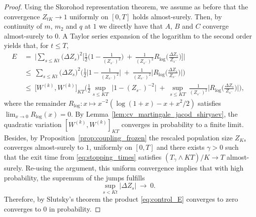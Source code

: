 \begin{refsegment}
\begin{proof}
Using the Skorohod representation theorem, we assume as before that the
convergence $Z_{tK}\to 1$ uniformly on $[0,T]$ holds almost-surely.
Then, by continuity of $m$, $m_2$ and $q$ at $1$ we directly have that
$A$, $B$ and $C$ converge almost-surely to $0$.
A Taylor series expansion of the logarithm to the second order yields
that, for $t\leqslant T$,
\begin{align}\nonumber
    E\ &= \ \Big|\sum_{s\leqslant Kt} \big(\Delta {Z}_{s}\big)^2\bigg[\frac{1}{2}\Big(1-\frac{1}{({Z}_{s^-})^2}\Big)\ +\ \frac{1}{({Z}_{s^-})^2}  R_{\log}\Big(\frac{\Delta {Z}_{s}}{{Z}_{s^-}}\Big)\bigg]\Big|\\\nonumber
    &\leqslant \ \sum_{s\leqslant Kt} \big(\Delta {Z}_{s}\big)^2\bigg(\frac{1}{2}\Big|1-\frac{1}{({Z}_{s^-})^2}\Big|\ +\ \frac{1}{({Z}_{s^-})^2}\Big| R_{\log}\Big(\frac{\Delta {Z}_{s}}{{Z}_{s^-}}\Big)\Big|\bigg)\\ \label{eq:control_E}
      &\leqslant\ \big[W^{(k)},W^{(k)}\big]_{KT}\bigg(\frac{1}{2}\sup_{s\leqslant KT}\ \big|1-(Z_{s^-})^{-2}\big|\ +\ \sup_{s\leqslant KT}\ \frac{1}{({Z}_{s^-})^2}\Big| R_{\log}\Big(\frac{\Delta {Z}_{s}}{{Z}_{s^-}} \Big)\Big|\bigg),
\end{align}
where the remainder $R_{\log}:x\mapsto x^{-2}(\log(1+x)-x+x^2/2)$ satisfies $\lim_{x\to 0}R_{\log}(x)=0$. By Lemma~\ref{lem:cv_martingale_jacod_shiryaev}, the quadratic variation $[W^{(k)},W^{(k)}]_{KT}$ converges in probability to a finite limit. Besides, by Proposition~\ref{prop:coupling_frozen} the rescaled population size $Z_{Ks}$ converges  almost-surely to $1$, uniformly on $[0,T]$ and there exists $\gamma>0$ such that the exit time  from \eqref{eq:stopping_times} satisfies $(T_{\gamma}\wedge KT)/K \to  T$ almost-surely. Re-using the argument, this uniform convergence implies that with high probability, the supremum of the jumps fulfills
\[
\sup_{s < Kt} |\Delta Z_s| \ \to \ 0.
\]
Therefore, by Slutsky's theorem the product \eqref{eq:control_E} converges to zero converges to $0$ in probability.


\end{proof}
\end{refsegment}
